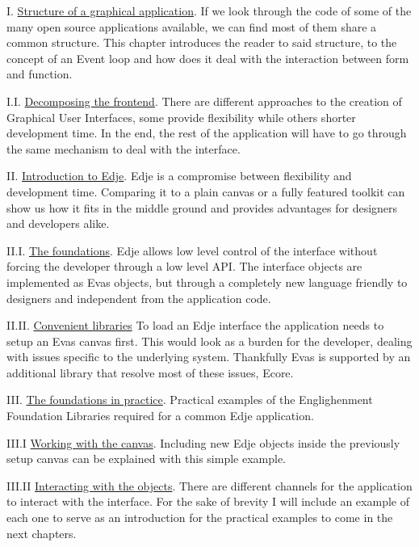 \documentclass[12pt,a4paper,english]{book}
\begin{document}
I. \href{\#structure-of-a-graphical-application}{Structure of a graphical application}.
If we look through the code of some of the many open source applications
available, we can find most of them share a common structure. This chapter
introduces the reader to said structure, to the concept of an Event loop and
how does it deal with the interaction between form and function.

I.I. \href{\#decomposing-the-frontend}{Decomposing the frontend}.
There are different approaches to the creation of Graphical User Interfaces,
some provide flexibility while others shorter development time. In the end, the
rest of the application will have to go through the same mechanism to deal
with the interface.

II. \href{\#introduction-to-edje}{Introduction to Edje}.
Edje is a compromise between flexibility and development time. Comparing it to
a plain canvas or a fully featured toolkit can show us how it fits in the
middle ground and provides advantages for designers and developers alike.

II.I. \href{\#the-foundations}{The foundations}.
Edje allows low level control of the interface without forcing the developer
through a low level API. The interface objects are implemented as Evas objects,
but through a completely new language friendly to designers and independent
from the application code.

II.II. \href{\#convenient-libraries}{Convenient libraries}
To load an Edje interface the application needs to setup an Evas canvas first.
This would look as a burden for the developer, dealing with issues specific to
the underlying system. Thankfully Evas is supported by an additional library
that resolve most of these issues, Ecore.

III. \href{\#the-foundations-in-practice}{The foundations in practice}.
Practical examples of the Englighenment Foundation Libraries required for a
common Edje application.

III.I \href{\#working-with-the-canvas}{Working with the canvas}.
Including new Edje objects inside the previously setup canvas can be explained
with this simple example.

III.II \href{\#interacting-with-the-objects}{Interacting with the objects}.
There are different channels for the application to interact with the
interface. For the sake of brevity I will include an example of each one to
serve as an introduction for the practical examples to come in the next
chapters.
\end{document}
